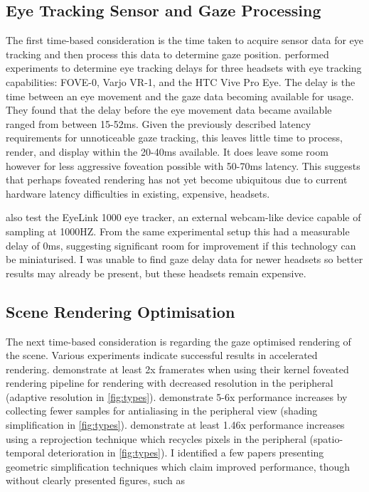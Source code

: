 \documentclass[a4paper,11pt]{article}
\begin{document}
\subsection{Eye Tracking Sensor and Gaze Processing}
\label{eye_optim}
The first time-based consideration is the time taken to acquire sensor data for eye tracking and then process this data to determine gaze position. \textcite{stein2021comparison} performed experiments to determine eye tracking delays for three headsets with eye tracking capabilities: FOVE-0, Varjo VR-1, and the HTC Vive Pro Eye. The delay is the time between an eye movement and the gaze data becoming available for usage. They found that the delay before the eye movement data became available ranged from between 15-52ms. Given the previously described latency requirements for unnoticeable gaze tracking, this leaves little time to process, render, and display within the 20-40ms available\cite{albert2017latency}. It does leave some room however for less aggressive foveation possible with 50-70ms latency\cite{albert2017latency}. This suggests that perhaps foveated rendering has not yet become ubiquitous due to current hardware latency difficulties in existing, expensive, headsets.

\textcite{stein2021comparison} also test the EyeLink 1000 eye tracker, an external webcam-like device capable of sampling at 1000HZ. From the same experimental setup this had a measurable delay of 0ms, suggesting significant room for improvement if this technology can be miniaturised. I was unable to find gaze delay data for newer headsets so better results may already be present, but these headsets remain expensive.

\subsection{Scene Rendering Optimisation}
\label{scene_rendering_optim}
The next time-based consideration is regarding the gaze optimised rendering of the scene. Various experiments indicate successful results in accelerated rendering. \textcite{meng2018kernel} demonstrate at least 2x framerates when using their kernel foveated rendering pipeline for rendering with decreased resolution in the peripheral (adaptive resolution in \cref{fig:types}). \textcite{guenter2012foveated} demonstrate 5-6x performance increases by collecting fewer samples for antialiasing in the peripheral view (shading simplification in \cref{fig:types}). \textcite{weier2016foveated} demonstrate at least 1.46x performance increases using a reprojection technique which recycles pixels in the peripheral (spatio-temporal deterioration in \cref{fig:types}). I identified a few papers presenting geometric simplification techniques which claim improved performance, though without clearly presented figures, such as \textcite{tiwary2020accelerated,zheng2018perceptual}
\end{document}

